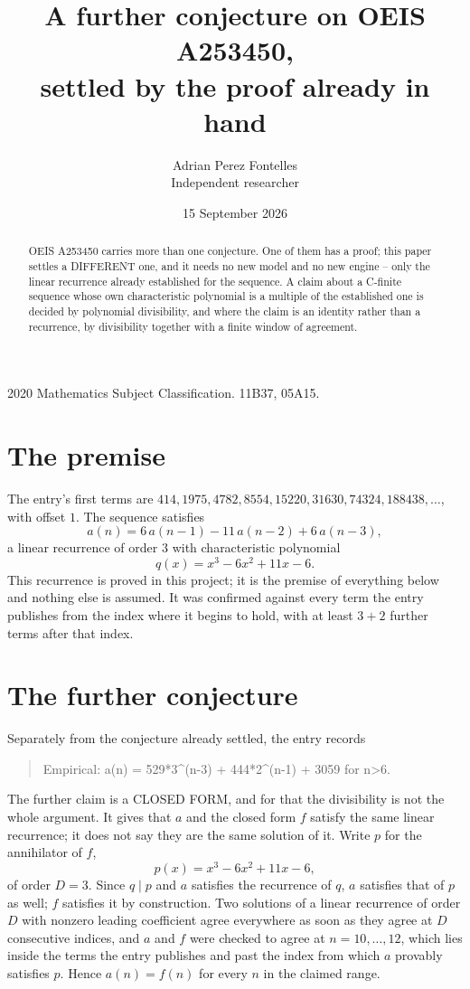 \documentclass[11pt,a4paper]{article}
\title{A further conjecture on OEIS A253450,\\ \large settled by the proof already in hand}
\author{Adrian Perez Fontelles\\ \small Independent researcher}
\date{15 September 2026}
\theoremstyle{plain}
\theoremstyle{definition}
\begin{document}
\maketitle

\begin{abstract}
OEIS A253450 carries more than one conjecture. One of them has a proof; this paper settles a
DIFFERENT one, and it needs no new model and no new engine -- only the linear recurrence already
established for the sequence. A claim about a C-finite sequence whose own characteristic
polynomial is a multiple of the established one is decided by polynomial divisibility, and where
the claim is an identity rather than a recurrence, by divisibility together with a finite window
of agreement.
\end{abstract}

\noindent\small 2020 Mathematics Subject Classification. 11B37, 05A15.\normalsize

\section{The premise}

The entry's first terms are $414, 1975, 4782, 8554, 15220, 31630, 74324, 188438,\dots$, with offset $1$. The sequence satisfies
\[
  a(n)=6\,a(n-1) - 11\,a(n-2) + 6\,a(n-3) ,
\]
a linear recurrence of order $3$ with characteristic polynomial
\[
  q(x)=x^{3} - 6 x^{2} + 11 x - 6 .
\]
This recurrence is proved in this project; it is the premise of everything below and nothing else is assumed.
It was confirmed against every term the entry publishes from the index where it begins to hold,
with at least $3+2$ further terms after that index.

\section{The further conjecture}

Separately from the conjecture already settled, the entry records

\begin{quote}\raggedright Empirical: a(n) = 529*3\^{}(n-3) + 444*2\^{}(n-1) + 3059 for n>6.\end{quote}

The further claim is a CLOSED FORM, and for that the divisibility is not the whole argument. It
gives that $a$ and the closed form $f$ satisfy the same linear recurrence; it does not say they
are the same solution of it. Write $p$ for the annihilator of $f$,
\[
  p(x)=x^{3} - 6 x^{2} + 11 x - 6 ,
\]
of order $D=3$. Since $q\mid p$ and $a$ satisfies the recurrence of $q$, $a$ satisfies that of
$p$ as well; $f$ satisfies it by construction. Two solutions of a linear recurrence of order $D$
with nonzero leading coefficient agree everywhere as soon as they agree at $D$ consecutive
indices, and $a$ and $f$ were checked to agree at $n=10,\dots,12$,
which lies inside the terms the entry publishes and past the index from which $a$ provably
satisfies $p$. Hence $a(n)=f(n)$ for every $n$ in the claimed range.
\end{document}
